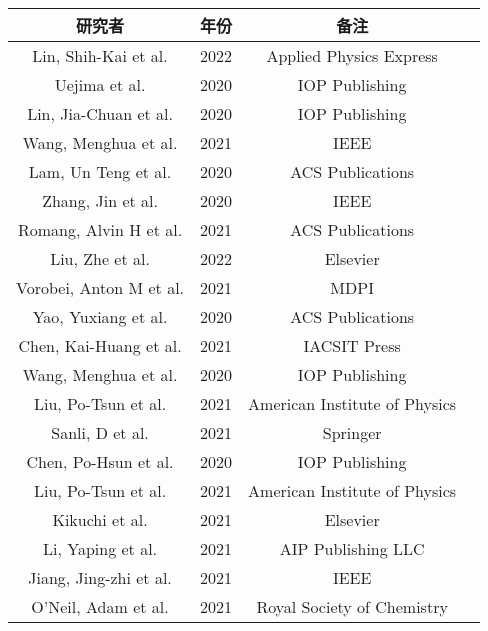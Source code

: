 \begin{center}
\begin{tabular}{cccc}
\hline
研究者 & 年份 & 备注 \\
\hline
Lin, Shih-Kai et al. \cite{linuse} & 2022 & Applied Physics Express \\
Uejima et al. \cite{uejima2013one} & 2020 & IOP Publishing \\
Lin, Jia-Chuan et al. \cite{lin2006improved} & 2020 & IOP Publishing \\
Wang, Menghua et al. \cite{wang2021highly} & 2021 & IEEE \\
Lam, Un Teng et al. \cite{lam2008processing} & 2020 & ACS Publications \\
Zhang, Jin et al. \cite{zhang2014breakdown} & 2020 & IEEE \\
Romang, Alvin H et al. \cite{romang2010supercritical} & 2021 & ACS Publications \\
Liu, Zhe et al. \cite{liu2022diffusion} & 2022 & Elsevier \\
Vorobei, Anton M et al. \cite{vorobei2021formation} & 2021 & MDPI \\
Yao, Yuxiang et al. \cite{yao2018supercritical} & 2020 & ACS Publications \\
Chen, Kai-Huang et al. \cite{chen2015electrical} & 2021 & IACSIT Press \\
Wang, Menghua et al. \cite{wang2020interface} & 2020 & IOP Publishing \\
Liu, Po-Tsun et al. \cite{liu2007effects} & 2021 & American Institute of Physics \\
Sanli, D et al. \cite{sanli2012synthesis} & 2021 & Springer \\
Chen, Po-Hsun et al. \cite{chen2020fully} & 2020 & IOP Publishing \\
Liu, Po-Tsun et al. \cite{liu2010effects} & 2021 & American Institute of Physics \\
Kikuchi et al. \cite{kikuchi2010development} & 2021 & Elsevier \\
Li, Yaping et al. \cite{li2018tuning} & 2021 & AIP Publishing LLC \\
Jiang, Jing-zhi et al. \cite{jiang2011study} & 2021 & IEEE \\
O'Neil, Adam et al. \cite{o2004green} & 2021 & Royal Society of Chemistry \\
\hline
\end{tabular}
\end{center}


